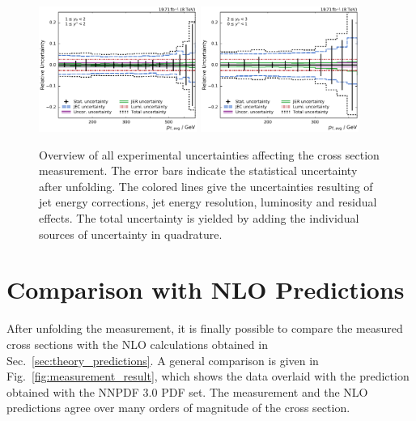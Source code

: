 \begin{figure}[htbp]
    \includegraphics[width=0.46\textwidth]{figures/measurement/exp_unc_overview_yb1ys1.pdf}\hfill
    \includegraphics[width=0.46\textwidth]{figures/measurement/exp_unc_overview_yb2ys0.pdf}
    \caption[Overview of experimental uncertainties]{Overview of all
    experimental uncertainties affecting the cross section measurement. The
    error bars indicate the statistical uncertainty after unfolding. The colored
    lines give the uncertainties resulting of jet energy corrections, jet energy
    resolution, luminosity and residual effects. The total uncertainty is yielded by
    adding the individual sources of uncertainty in quadrature.}
    \label{fig:exp_unc_overview}
\end{figure}

\section{Comparison with NLO Predictions}
\label{sec:nlo_comparisons}

After unfolding the measurement, it is finally possible to
compare the measured cross sections with the NLO calculations obtained in
Sec.~\ref{sec:theory_predictions}. A general comparison is given in
Fig.~\ref{fig:measurement_result}, which shows the data overlaid with the
\NLOJETPP prediction obtained with the NNPDF 3.0 PDF set. The measurement
and the NLO predictions agree over many orders of magnitude of the cross section.

